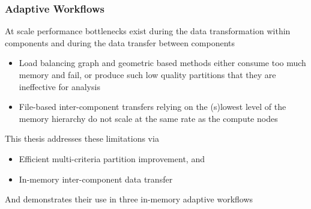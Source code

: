 \documentclass{beamer}
\begin{document}
\begin{frame}
  \frametitle{Adaptive Workflows}
  At scale performance bottlenecks exist during the data transformation
  within components and during the data transfer between components\\
  \begin{itemize}
    \item Load balancing graph and geometric based methods either consume too
      much memory and fail, or produce such low quality partitions that they are
      ineffective for analysis
    \item File-based inter-component transfers relying on the (s)lowest level of the
      memory hierarchy do not scale at the same rate as the compute nodes
  \end{itemize}
  This thesis addresses these limitations via
  \begin{itemize}
    \item Efficient multi-criteria partition improvement, and
    \item In-memory inter-component data transfer
  \end{itemize}
  And demonstrates their use in three in-memory adaptive workflows 
\end{frame}

\end{document}

